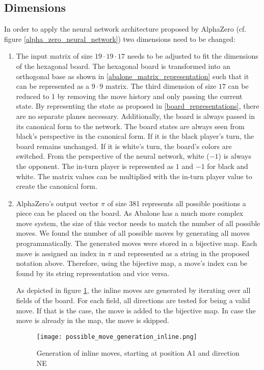 \subsection{Dimensions}
In order to apply the neural network architecture proposed by AlphaZero (cf. figure \ref{alpha_zero_neural_network}) two dimensions need to be changed:
\begin{enumerate}
    \item The input matrix of size $19 \cdot 19 \cdot 17$ needs to be adjusted to fit the dimensions of the hexagonal board. The hexagonal board is transformed into an orthogonal base as shown in \ref{abalone_matrix_representation} such that it can be represented as a $9 \cdot 9$ matrix.
          The third dimension of size $17$ can be reduced to 1 by removing the move history and only passing the current state. By representing the state as proposed in \ref{board_representations}, there are no separate planes necessary. Additionally, the board is always passed in its canonical form to the network. The board states are always seen from black's perspective in the canonical form. If it is the black player's turn, the board remains unchanged. If it is white's turn, the board's colors are switched. From the perspective of the neural network, white ($-1$) is always the opponent. The in-turn player is represented as $1$ and $-1$ for black and white. The matrix values can be multiplied with the in-turn player value to create the canonical form.
    \item AlphaZero's output vector $\pi$ of size 381 represents all possible positions a piece can be placed on the board. As Abalone has a much more complex move system, the size of this vector needs to match the number of all possible moves. We found the number of all possible moves by generating all moves programmatically. The generated moves were stored in a bijective map. Each move is assigned an index in $\pi$ and represented as a string in the proposed notation above. Therefore, using the bijective map, a move's index can be found by its string representation and vice versa.

          As depicted in figure \ref{possible_move_generation_inline}, the inline moves are generated by iterating over all fields of the board. For each field, all directions are tested for being a valid move. If that is the case, the move is added to the bijective map. In case the move is already in the map, the move is skipped.

          \begin{figure}
              \centering
              \texttt{[image: possible\_move\_generation\_inline.png]}
              \caption{Generation of inline moves, starting at position A1 and direction NE}
              \label{possible_move_generation_inline}
          \end{figure}


\end{enumerate}
